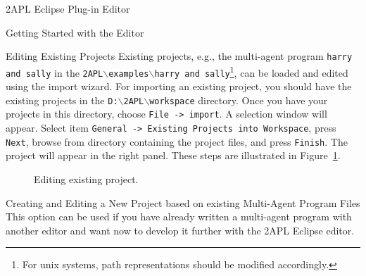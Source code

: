 \begin{chapter}{2APL Eclipse Plug-in Editor}
\begin{section}{Getting Started with the Editor}
\begin{subsection}{Editing Existing Projects}
Existing projects, e.g., the multi-agent program {\tt harry and
sally} in the {\tt 2APL$\backslash$examples$\backslash$harry and
sally}\footnote{For unix systems, path representations should be
modified accordingly.}, can be loaded and edited using the import
wizard. For importing an existing project, you should have the
existing projects in the
\texttt{D:$\backslash$2APL$\backslash$workspace} directory. Once you
have your projects in this directory, choose {\tt File -> import}. A
selection window will appear. Select item {\tt General -> Existing
Projects into Workspace}, press {\tt Next}, browse from directory
containing the project files, and press {\tt Finish}. The project
will appear in the right panel. These steps are illustrated in
Figure~\ref{fig:existingproject}.
    \begin{figure}[h]
        \begin{minipage}{0.3\linewidth}
            \begin{center}
            \end{center}
        \end{minipage}
        \hspace{.5cm}
        \begin{minipage}{0.3\linewidth}
            \begin{center}
            \end{center}
        \end{minipage}
        \hspace{.5cm}
        \begin{minipage}{0.3\linewidth}
            \begin{center}
            \end{center}
        \end{minipage}
        \caption{Editing existing project.}\label{fig:existingproject}
    \end{figure}
\end{subsection}

\begin{subsection}{Creating and Editing a New Project based on existing Multi-Agent Program Files}
This option can be used if you have already written a multi-agent
program with another editor and want now to develop it further with
the 2APL Eclipse editor.


\end{subsection}
\end{section}
\end{chapter}
